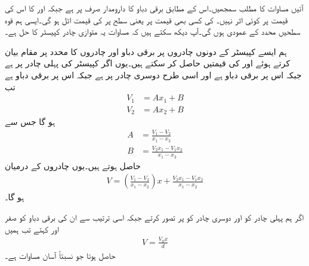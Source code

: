 آئیں مساوات  کا مطلب سمجھیں۔اس کے مطابق برقی دباو کا دارومدار صرف  پر ہے  جبکہ  اور  کا اس کی قیمت پر کوئی اثر نہیں۔ کی کسی بھی قیمت پر یعنی  سطح پر  کی قیمت اٹل ہو گی۔ایسی ہم قوہ سطحیں  محدد کے عمودی ہوں گی۔آپ دیکھ سکتے ہیں کہ مساوات  یہ متوازی چادر کپیسٹر کا حل ہے۔

ہم ایسے کپیسٹر کے دونوں چادروں پر برقی دباو اور چادروں کا  محدد پر مقام بیان کرتے ہوئے   اور  کی قیمتیں حاصل کر سکتے ہیں۔یوں اگر کپیسٹر کی پہلی  چادر   پر ہے جبکہ اس پر برقی دباو  ہے اور اسی طرح دوسری چادر  پر ہے جبکہ اس پر برقی دباو  ہے تب
\begin{align*}
V_1&=A x_1+B\\
V_2&=Ax_2+B
\end{align*}
ہو گا جس سے
\begin{align*}
A&=\frac{V_1-V_2}{x_1-x_2}\\
B&=\frac{V_2 x_1-V_1x_2}{x_1-x_2}
\end{align*}
حاصل ہوتے ہیں۔یوں چادروں کے درمیان
\begin{align}
V=\left(\frac{V_1-V_2}{x_1-x_2}\right)x+\frac{V_2 x_1-V_1x_2}{x_1-x_2}
\end{align}
ہو گا۔

اگر ہم پہلی  چادر کو  اور دوسری چادر کو  پر تصور کرتے جبکہ اسی ترتیب سے ان کی برقی دباو کو صفر اور  کہتے تب ہمیں
\begin{align}\label{مساوات_لاپلاس_کارتیسی_برقی_دباو}
V=\frac{V_0 x}{d}
\end{align}
حاصل ہوتا جو نسبتاً آسان مساوات ہے۔

